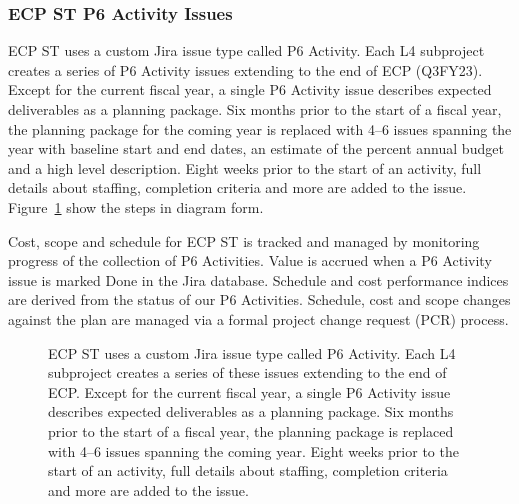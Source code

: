 \subsubsection{ECP ST P6 Activity Issues}

ECP ST uses a custom Jira issue type called P6 Activity.  Each L4 subproject creates a series of P6 Activity issues extending to the end of ECP (Q3FY23).  Except for the current fiscal year, a single P6 Activity issue describes expected deliverables as a planning package.  Six months prior to the start of a fiscal year, the planning package for the coming year is replaced with 4--6 issues spanning the year with baseline start and end dates, an estimate of the percent annual budget and a high level description.  Eight weeks prior to the start of an activity, full details about staffing, completion criteria and more are added to the issue.  Figure~\ref{fig:planning-process} show the steps in diagram form.  

Cost, scope and schedule for ECP ST is tracked and managed by monitoring progress of the collection of P6 Activities.  Value is accrued when a P6 Activity issue is marked Done in the Jira database.  Schedule and cost performance indices are derived from the status of our P6 Activities.  Schedule, cost and scope changes against the plan are managed via a formal project change request (PCR) process.

\begin{figure}
	\centering
	\caption{ECP ST uses a custom Jira issue type called P6 Activity.  Each L4 subproject creates a series of these issues extending to the end of ECP.  Except for the current fiscal year, a single P6 Activity issue describes expected deliverables as a planning package.  Six months prior to the start of a fiscal year, the planning package is replaced with 4--6 issues spanning the coming year.  Eight weeks prior to the start of an activity, full details about staffing, completion criteria and more are added to the issue.}
	\label{fig:planning-process}
\end{figure}


